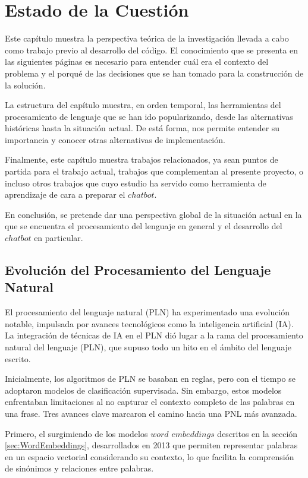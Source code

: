 \chapter{Estado de la Cuestión}
\label{cap:estadoDeLaCuestion}
Este capítulo muestra la perspectiva teórica de la investigación llevada a cabo como trabajo previo al desarrollo del código. El conocimiento que se presenta en las siguientes páginas es necesario para entender cuál era el contexto del problema y el porqué de las decisiones que se han tomado para la construcción de la solución.

La estructura del capítulo muestra, en orden temporal, las herramientas del procesamiento de lenguaje que se han ido popularizando, desde las alternativas históricas hasta la situación actual. De está forma, nos permite entender su importancia y conocer otras alternativas de implementación.

Finalmente, este capítulo muestra trabajos relacionados, ya sean puntos de partida para el trabajo actual, trabajos que complementan al presente proyecto, o incluso otros trabajos que cuyo estudio ha servido como herramienta de aprendizaje de cara a preparar el $chatbot$. 

En conclusión, se pretende dar una perspectiva global de la situación actual en la que se encuentra el procesamiento del lenguaje en general y el desarrollo del $chatbot$ en particular.  
\section{Evolución del Procesamiento del Lenguaje Natural}
El procesamiento del lenguaje natural (PLN) ha experimentado una evolución notable, impulsada por avances tecnológicos como la inteligencia artificial (IA). La integración de técnicas de IA en el PLN dió lugar a la rama del procesamiento natural del lenguaje (PLN), que supuso todo un hito en el ámbito del lenguaje escrito.

Inicialmente, los algoritmos de PLN se basaban en reglas, pero con el tiempo se adoptaron modelos de clasificación supervisada. Sin embargo, estos modelos enfrentaban limitaciones al no capturar el contexto completo de las palabras en una frase. Tres avances clave marcaron el camino hacia una PNL más avanzada. 

Primero, el surgimiendo de los modelos $word$ $embeddings$ descritos en la sección \ref{sec:WordEmbeddings}, desarrollados en 2013 que permiten representar palabras en un espacio vectorial considerando su contexto, lo que facilita la comprensión de sinónimos y relaciones entre palabras. 

